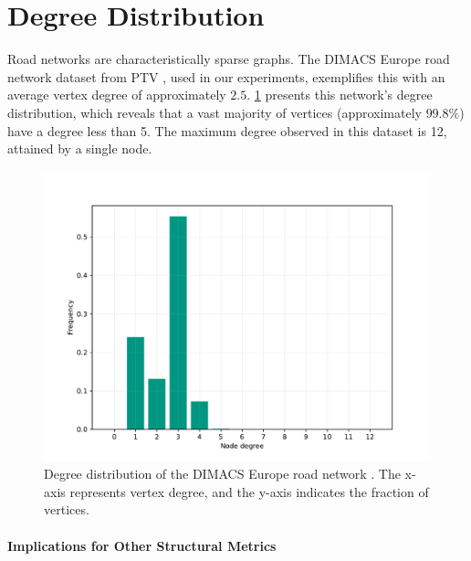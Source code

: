 \section{Degree Distribution}
\label{sec:degree_distribution}

Road networks are characteristically sparse graphs.
The DIMACS Europe road network dataset from PTV \cite{ptv_group_dimacs-europe_2009}, used in our experiments, exemplifies this with an average vertex degree of approximately \(2.5\).
\cref{fig:degree_dist_europe} presents this network's degree distribution, which reveals that a vast majority of vertices (approximately \(99.8\%\)) have a degree less than 5.
The maximum degree observed in this dataset is 12, attained by a single node.

\begin{figure}[tbhp]
    \centering
    \includegraphics[width=0.6\linewidth]{graphics/degree_overview_europe.pdf}
    \caption{Degree distribution of the DIMACS Europe road network \cite{ptv_group_dimacs-europe_2009}. The x-axis represents vertex degree, and the y-axis indicates the fraction of vertices.}
    \label{fig:degree_dist_europe}
\end{figure}

\paragraph{Implications for Other Structural Metrics}
\label{sec:degree_related_metrics}

